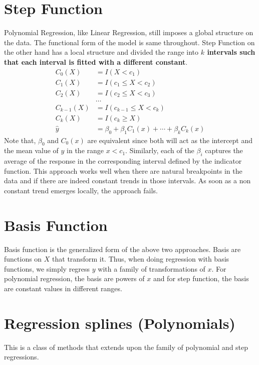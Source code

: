 \documentclass[../statistical_learning_notes.tex]{subfiles}
\begin{document}
    \section{Step Function}
    Polynomial Regression, like Linear Regression, still imposes a global structure on the data. The functional form of the model is same throughout. Step Function on the other hand has a local structure and divided the range into \textbf{$k$ intervals such that each interval is fitted with a different constant}.
    \begin{align*}
        C_{0}(X) &= I(X < c_{1})\\
        C_{1}(X) &= I(c_{1} \leq X < c_{2})\\
        C_{2}(X) &= I(c_{2} \leq X < c_{3})\\
        &\hdots\\
        C_{k-1}(X) &= I(c_{k-1} \leq X < c_{k})\\
        C_{k}(X) &= I(c_{k} \geq X)\\
        \hat{y} &= \beta_{0} + \beta_{1}C_{1}(x) + \cdots + \beta_{k}C_{k}(x)
    \end{align*}
    Note that, $\beta_{0}$ and $C_{0}(x)$ are equivalent since both will act as the intercept and the mean value of $y$ in the range $x < c_{1}$. Similarly, each of the $\beta_{i}$ captures the average of the response in the corresponding interval defined by the indicator function.\newline
    This approach works well when there are natural breakpoints in the data and if there are indeed constant trends in those intervals. As soon as a non constant trend emerges locally, the approach fails.

    
    \section{Basis Function}
    Basis function is the generalized form of the above two approaches. Basis are functions on $X$ that transform it. Thus, when doing regression with basis functions, we simply regress $y$ with a family of transformations of $x$.\newline
    For polynomial regression, the basis are powers of $x$ and for step function, the basis are constant values in different ranges.

    
    \section{Regression splines (Polynomials)}
    This is a class of methods that extends upon the family of polynomial and step regressions.\newline
\end{document}

